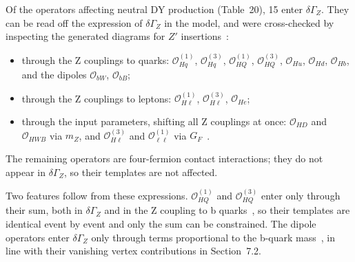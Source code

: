 Of the operators affecting neutral DY production
(Table~20),
15 enter $\delta\Gamma_Z$. They can be read off the expression of
$\delta\Gamma_Z$ in the model, and were cross-checked by inspecting the generated
diagrams for $Z'$ insertions~\cite{EFT2Obs}:
\begin{itemize}
  \item through the Z couplings to quarks: $\mathcal{O}_{Hq}^{(1)}$,
    $\mathcal{O}_{Hq}^{(3)}$, $\mathcal{O}_{HQ}^{(1)}$, $\mathcal{O}_{HQ}^{(3)}$,
    $\mathcal{O}_{Hu}$, $\mathcal{O}_{Hd}$, $\mathcal{O}_{Hb}$, and the dipoles
    $\mathcal{O}_{bW}$, $\mathcal{O}_{bB}$;
  \item through the Z couplings to leptons: $\mathcal{O}_{H\ell}^{(1)}$,
    $\mathcal{O}_{H\ell}^{(3)}$, $\mathcal{O}_{He}$;
  \item through the input parameters, shifting all Z couplings at once:
    $\mathcal{O}_{HD}$ and $\mathcal{O}_{HWB}$ via $m_Z$, and
    $\mathcal{O}_{H\ell}^{(3)}$ and $\mathcal{O}_{\ell\ell}^{(1)}$ via
    $G_F$~\cite[Table~4]{Brivio:2020onw}.
\end{itemize}
The remaining operators are four-fermion contact interactions; they do not
appear in $\delta\Gamma_Z$, so their templates are not affected.

Two features follow from these expressions. $\mathcal{O}_{HQ}^{(1)}$ and
$\mathcal{O}_{HQ}^{(3)}$ enter only through their sum, both in $\delta\Gamma_Z$ and
in the Z coupling to b quarks~\cite[Eq.~(A.5)]{Brivio:2020onw}, so their templates
are identical event by event and only the sum can be constrained. The dipole
operators enter $\delta\Gamma_Z$ only through terms proportional to the b-quark
mass~\cite[Eq.~(A.12)]{Brivio:2020onw}, in line with their vanishing vertex
contributions in Section~7.2.


